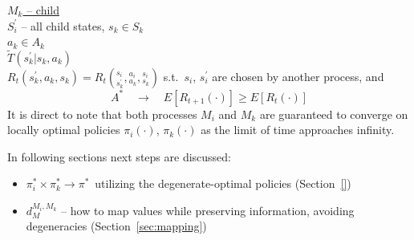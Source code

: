 \underline{$M_k$ -- child}\\

$S^\prime_i$ -- all child states, $s_k\in S_k$\\
$a_k\in A_k$\\
$\tilde{T}(s^\prime_k|s_k,a_k)$\\
$R_t(s^\prime_k,a_k,s_k)=R_t\left({}^{s_i}_{s^\prime_k},{}^{a_i}_{a_k},{}^{s_i}_{s_k}\right)$
s.t.\ $s_i$, $s^\prime_i$ are chosen by another process, and
\begin{equation*}
\boxed{A^*}\quad\longrightarrow\quad E[R_{t+1}(\cdot)]\geq E[R_t(\cdot)]
\end{equation*}
It is direct to note that both processes $M_i$ and $M_k$ are guaranteed to converge on locally optimal policies $\pi_i(\cdot)$, $\pi_k(\cdot)$ as the limit of time approaches infinity. 

In following sections next steps are discussed:
\begin{itemize}
\item $\pi^\ast_i \times \pi^\ast_k \to \pi^\ast${\ }utilizing the degenerate-optimal policies (Section~\ref{})
\item $d^{M_i, M_k}_{M}$ -- how to map values while preserving information, avoiding degeneracies (Section~\ref{sec:mapping})
\end{itemize}

